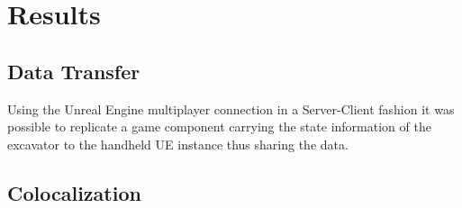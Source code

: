 \chapter{Results}\label{sec:results}

\section{Data Transfer}\label{sec:result_data}

Using the Unreal Engine multiplayer connection in a Server-Client fashion it was possible to replicate a game component carrying the state information of the excavator to the handheld UE instance thus sharing the data.



\section{Colocalization}\label{sec:result_coloc}